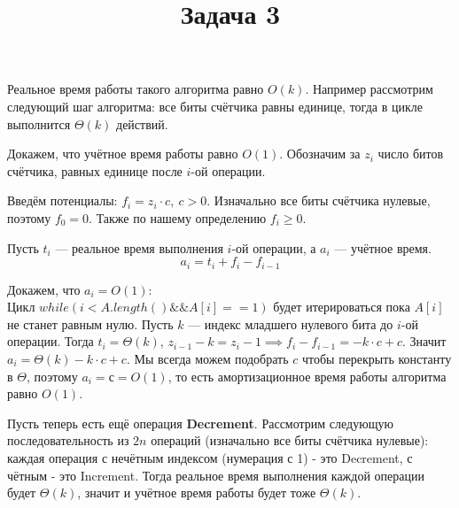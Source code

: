 \documentclass{article}
\title{Задача 3}
\date{}
\begin{document}
\maketitle
\LARGE

Реальное время работы такого алгоритма равно $O(k)$. 
Например рассмотрим следующий шаг алгоритма: все биты счётчика равны единице, тогда в цикле выполнится $\Theta(k)$ действий.

Докажем, что учётное время работы равно $O(1)$. Обозначим за $z_i$ число битов счётчика, равных единице после $i$-ой операции. 

Введём потенциалы: $f_i=z_i\cdot c,\ c>0$. Изначально все биты счётчика нулевые, поэтому $f_0=0$. Также по нашему определению $f_i\geqslant0$.

Пусть $t_i$ --- реальное время выполнения $i$-ой операции, а $a_i$ --- учётное время. 
$$a_i = t_i+f_i-f_{i-1}$$

Докажем, что $a_i=O(1)$:\\
Цикл $while (i < A.length() \&\& A[i] == 1)$ будет итерироваться пока $A[i]$ не станет равным нулю. Пусть $k$ --- индекс младшего нулевого бита до $i$-ой операции. Тогда $t_i=\Theta(k)$, $z_{i-1}-k=z_i-1 \implies f_i-f_{i-1}=-k\cdot c+c$. Значит $a_i=\Theta(k)-k\cdot c + c$. Мы всегда можем подобрать $c$ чтобы перекрыть константу в $\Theta$, поэтому $a_i=с=O(1)$, то есть амортизационное время работы алгоритма равно $O(1)$.

Пусть теперь есть ещё операция \textbf{Decrement}. Рассмотрим следующую последовательность из $2n$ операций (изначально все биты счётчика нулевые): каждая операция с нечётным индексом (нумерация с 1) - это Decrement, с чётным - это Increment. Тогда реальное время выполнения каждой операции будет $\Theta(k)$, значит и учётное время работы будет тоже $\Theta(k)$.
\end{document}

